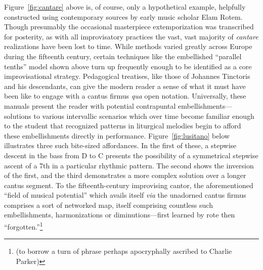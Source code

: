     Figure~\ref{fig:cantare} above is, of course, only a hypothetical example, helpfully constructed using contemporary sources by early music scholar Elam Rotem. Though presumably the occasional masterpiece extemporization was transcribed for posterity, as with all improvisatory practices the vast, vast majority of \textit{cantare} realizations have been lost to time. While methods varied greatly across Europe during the fifteenth century, certain techniques like the embellished ``parallel tenths'' model shown above turn up frequently enough to be identified as a core improvisational strategy.\autocite{Rotem_2022} Pedagogical treatises, like those of Johannes Tinctoris and his descendants, can give the modern reader a sense of what it must have been like to engage with a cantus firmus \textit{qua} open notation. Universally, these manuals present the reader with potential contrapuntal embellishments---solutions to various intervallic scenarios which over time become familiar enough to the student that recognized patterns in liturgical melodies begin to afford these embellishments directly in performance. Figure~\ref{fig:lusitano} below illustrates three such bite-sized affordances. In the first of these, a stepwise descent in the bass from D to C presents the possibility of a symmetrical stepwise ascent of a 7th in a particular rhythmic pattern. The second shows the inversion of the first, and the third demonstrates a more complex solution over a longer cantus segment. To the fifteenth-century improvising cantor, the aforementioned ``field of musical potential'' which avails itself \textit{via} the unadorned cantus firmus comprises a sort of networked map, itself comprising countless such embellishments, harmonizations or diminutions---first learned by rote then ``forgotten.''\footnote{(to borrow a turn of phrase perhaps apocryphally ascribed to Charlie Parker)}

